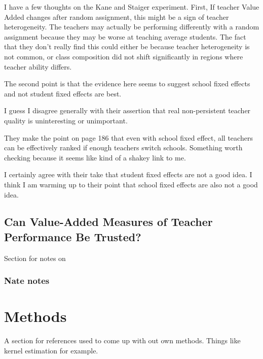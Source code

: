 \documentclass[letterpaper,12pt]{article}
\begin{document}
         I have a few thoughts on the Kane and Staiger experiment. First, If teacher Value Added changes after random assignment, this might be a sign of teacher heterogeneity. The teachers may actually be performing differently with a random assignment because they may be worse at teaching average students. The fact that they don't really find this could either be because teacher heterogeneity is not common, or class composition did not shift significantly in regions where teacher ability differs.  
         
         The second point is that the evidence here seems to suggest school fixed effects and not student fixed effects are best. 
         
         I guess I disagree generally with their assertion that real non-persistent teacher quality is uninteresting or unimportant. 
    
        They make the point on page 186 that even with school fixed effect, all teachers can be effectively ranked if enough teachers switch schools. Something worth checking because it seems like kind of a shakey link to me. 
        
        I certainly agree with their take that student fixed effects are not a good idea. I think I am warming up to their point that school fixed effects are also not a good idea. 
    
    \subsection{Can Value-Added Measures of Teacher Performance Be Trusted?}
    
    Section for notes on \cite{Woolrdige2014}
    
    \subsubsection{Nate notes}

\section{Methods}
A section for references used to come up with out own methods. Things like kernel estimation for example. 

\subsection{}
\end{document}
